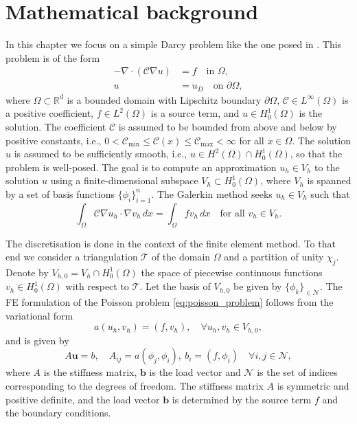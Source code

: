 \chapter{Mathematical background}\label{ch:background}\newpage
In this chapter we focus on a simple Darcy problem like the one posed in \cite{acms_coarse_space_Heinlein2018,ams_coarse_space_comp_study_Alves2024}. This problem is of the form
\begin{equation}
  \label{eq:elliptic_problem}
  \begin{aligned}
    -\nabla\cdot\left(\mathcal{C}\nabla u\right) & = f \quad \text{in } \Omega,           \\
    u                                       & = u_D \quad \text{on } \partial\Omega,
  \end{aligned}
\end{equation}
where $\Omega\subset\mathbb{R}^d$ is a bounded domain with Lipschitz boundary $\partial\Omega$, $\mathcal{C}\in L^\infty(\Omega)$ is a positive coefficient, $f\in L^2(\Omega)$ is a source term, and $u\in H^1_0(\Omega)$ is the solution. The coefficient $\mathcal{C}$ is assumed to be bounded from above and below by positive constants, i.e., $0 < \mathcal{C}_{\min} \leq \mathcal{C}(x) \leq \mathcal{C}_{\max} < \infty$ for all $x\in\Omega$. The solution $u$ is assumed to be sufficiently smooth, i.e., $u\in H^2(\Omega)\cap H^1_0(\Omega)$, so that the problem is well-posed. The goal is to compute an approximation $u_h\in V_h$ to the solution $u$ using a finite-dimensional subspace $V_h\subset H^1_0(\Omega)$, where $V_h$ is spanned by a set of basis functions $\{\phi_i\}_{i=1}^n$. The Galerkin method seeks $u_h\in V_h$ such that
\begin{equation}
  \label{eq:galerkin}
  \int_\Omega \mathcal{C}\nabla u_h\cdot\nabla v_h\,dx = \int_\Omega f v_h\,dx \quad \text{for all } v_h\in V_h.
\end{equation}

The discretisation is done in the context of the finite element method. To that end we consider a triangulation $\mathcal{T}$ of the domain $\Omega$ and a partition of unity $\chi_j$. Denote by $V_{h,0} = V_h \cap H^1_0(\Omega)$ the space of piecewise continuous functions $v_h\in H^1_0(\Omega)$ with respect to $\mathcal{T}$. Let the basis of $V_{h,0}$ be given by $\{\phi_k\}_{\in\mathcal{N}}$. The FE formulation of the Poisson problem \cref{eq:poisson_problem} follows from the variational form
\[
    a(u_h, v_h) = (f, v_h), \quad \forall u_h, v_h \in V_{h,0},
\]
and is given by
\begin{equation}
    A\mathbf{u} = b, \quad A_{ij} = a(\phi_j, \phi_i), \ b_i = (f, \phi_i) \quad \forall i,j\in\mathcal{N},
\end{equation}
where $A$ is the stiffness matrix, $\mathbf{b}$ is the load vector and $\mathcal{N}$ is the set of indices corresponding to the degrees of freedom. The stiffness matrix $A$ is symmetric and positive definite, and the load vector $\mathbf{b}$ is determined by the source term $f$ and the boundary conditions.

